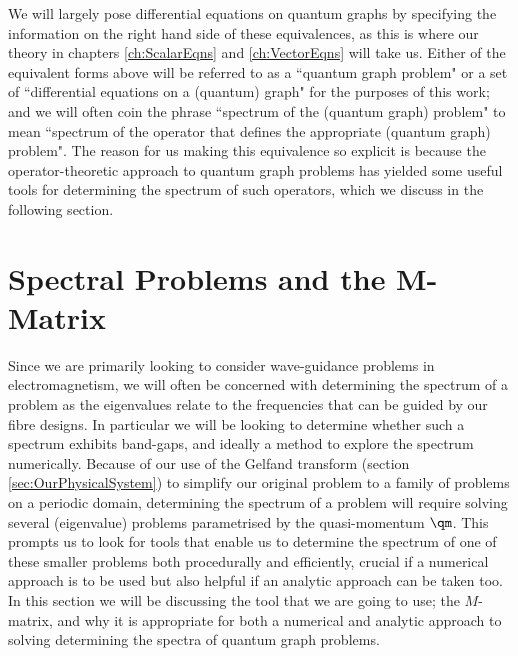 We will largely pose differential equations on quantum graphs by specifying the information on the right hand side of these equivalences, as this is where our theory in chapters \ref{ch:ScalarEqns} and \ref{ch:VectorEqns} will take us.
Either of the equivalent forms above will be referred to as a ``quantum graph problem" or a set of ``differential equations on a (quantum) graph" for the purposes of this work; and we will often coin the phrase ``spectrum of the (quantum graph) problem" to mean ``spectrum of the operator that defines the appropriate (quantum graph) problem".
The reason for us making this equivalence so explicit is because the operator-theoretic approach to quantum graph problems has yielded some useful tools for determining the spectrum of such operators, which we discuss in the following section.

\section{Spectral Problems and the M-Matrix} \label{sec:M-MatrixTheory}
Since we are primarily looking to consider wave-guidance problems in electromagnetism, we will often be concerned with determining the spectrum of a problem as the eigenvalues relate to the frequencies that can be guided by our fibre designs.
In particular we will be looking to determine whether such a spectrum exhibits band-gaps, and ideally a method to explore the spectrum numerically.
Because of our use of the Gelfand transform (section \ref{sec:OurPhysicalSystem}) to simplify our original problem to a family of problems on a periodic domain, determining the spectrum of a problem will require solving several (eigenvalue) problems parametrised by the quasi-momentum $\qm$.
This prompts us to look for tools that enable us to determine the spectrum of one of these smaller problems both procedurally and efficiently, crucial if a numerical approach is to be used but also helpful if an analytic approach can be taken too.
In this section we will be discussing the tool that we are going to use; the $M$-matrix, and why it is appropriate for both a numerical and analytic approach to solving determining the spectra of quantum graph problems. \newline

